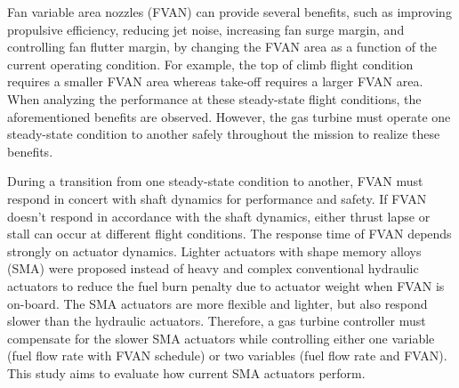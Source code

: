 Fan variable area nozzles (FVAN) can provide several benefits, such as improving propulsive efficiency, reducing jet noise, increasing fan surge margin, and controlling fan flutter margin, by changing the FVAN area as a function of the current operating condition.  For example, the top of climb flight condition requires a smaller FVAN area whereas take-off requires a larger FVAN area. When analyzing the performance at these steady-state flight conditions, the aforementioned benefits are observed.  However, the gas turbine must operate one steady-state condition to another safely throughout the mission to realize these benefits. 

During a transition from one steady-state condition to another, FVAN must respond in concert with shaft dynamics for performance and safety. If FVAN doesn't respond in accordance with the shaft dynamics, either thrust lapse or stall can occur at different flight conditions. The response time of FVAN depends strongly on actuator dynamics. Lighter actuators with shape memory alloys (SMA) were proposed instead of heavy and complex conventional hydraulic actuators to reduce the fuel burn penalty due to actuator weight when FVAN is on-board. The SMA actuators are more flexible and lighter, but also respond slower than the hydraulic actuators. Therefore, a gas turbine controller must compensate for the slower SMA actuators while controlling either one variable (fuel flow rate with FVAN schedule) or two variables (fuel flow rate and FVAN). This study aims to evaluate how current SMA actuators perform. %

